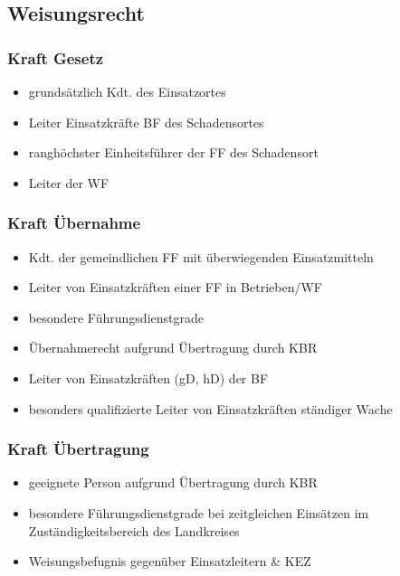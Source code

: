 \subsection{Weisungsrecht}
\begin{normbox}{\subsubsection{Kraft Gesetz}}
    \begin{itemize}
        \item grundsätzlich Kdt. des Einsatzortes
        \item Leiter Einsatzkräfte BF des Schadensortes
        \item ranghöchster Einheitsführer der FF des Schadensort
        \item Leiter der WF
    \end{itemize}
\end{normbox}
\begin{normbox}{\subsubsection{Kraft Übernahme}}
    \begin{itemize}
        \item Kdt. der gemeindlichen FF mit überwiegenden Einsatzmitteln
        \item Leiter von Einsatzkräften einer FF in Betrieben/WF
        \item besondere Führungsdienstgrade
        \item Übernahmerecht aufgrund Übertragung durch KBR
        \item Leiter von Einsatzkräften (gD, hD) der BF
        \item besonders qualifizierte Leiter von Einsatzkräften ständiger Wache
    \end{itemize}
\end{normbox}
\begin{normbox}{\subsubsection{Kraft Übertragung}}
    \begin{itemize}
        \item geeignete Person aufgrund Übertragung durch KBR
        \item besondere Führungsdienstgrade bei zeitgleichen Einsätzen im Zuständigkeitsbereich des Landkreises
        \item Weisungsbefugnis gegenüber Einsatzleitern \& KEZ
    \end{itemize}
\end{normbox}
